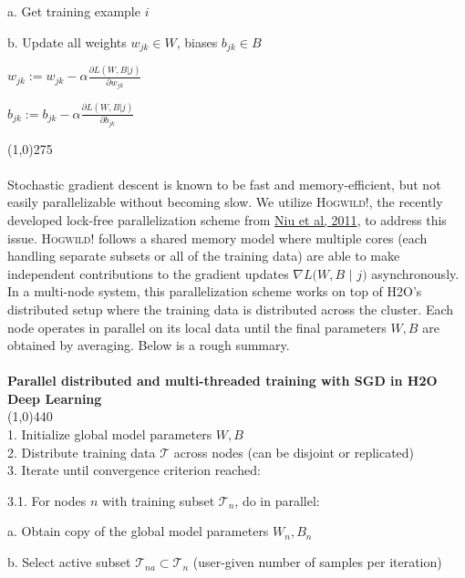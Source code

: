 \hspace{1cm} a. Get training example $i$

\hspace{1cm} b. Update all weights $w_{jk} \in W$, biases $b_{jk} \in B$

\hspace{2cm}  $w_{jk} := w_{jk} - \alpha \frac{\partial L(W,B | j)}{\partial w_{jk}}$

\hspace{2cm} $b_{jk} := b_{jk} - \alpha \frac{\partial L(W,B | j)}{\partial b_{jk}}$

\line(1,0){275}
\\
\\  
Stochastic gradient descent is known to be fast and memory-efficient, but not easily parallelizable without becoming slow. We utilize \textsc{Hogwild!}, the recently developed lock-free parallelization scheme from \href{http://i.stanford.edu/hazy/papers/hogwild-nips.pdf}{Niu et al, 2011}, to address this issue. \textsc{Hogwild!} follows a shared memory model where multiple cores  (each handling separate subsets or all of the training data) are able to make independent contributions to the gradient updates $\nabla L(W,B$ $ |$ $j)$ asynchronously. In a multi-node system, this parallelization scheme works on top of H2O's distributed setup where the training data is distributed across the cluster. Each node operates in parallel on its local data until the final parameters $W,B$ are obtained by averaging. Below is a rough summary.
\\
\\
\noindent
{\bf{\footnotesize{Parallel distributed and multi-threaded training with SGD in H2O Deep Learning}}}
\\
\line(1,0){440}
\\
1. Initialize global model parameters $W,B$
\\
2. Distribute training data $\mathcal{T}$ across nodes (can be disjoint or replicated)
\\
3. Iterate until convergence criterion reached:

\hspace{1cm} 3.1. For nodes $n$ with training subset $\mathcal{T}_n$, do in parallel:

\hspace{2cm}  a. Obtain copy of the global model parameters $W_n, B_n$

\hspace{2cm}  b. Select active subset $\mathcal{T}_{na} \subset \mathcal{T}_n$ (user-given number of samples per iteration)

